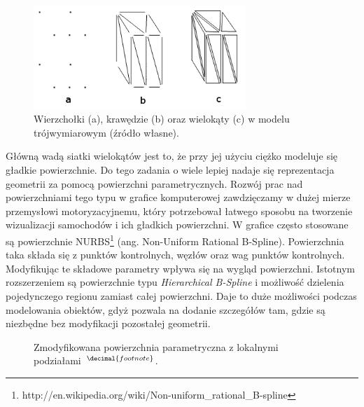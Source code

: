 \begin{figure}
\centering
\includegraphics[width=8cm]{images/v_e_f.png}
\caption{Wierzchołki (a), krawędzie (b) oraz wielokąty (c) w modelu
trójwymiarowym (źródło własne).}
\label{vef_image}
\end{figure}

Główną wadą siatki wielokątów jest to, że przy jej użyciu ciężko modeluje się
gładkie powierzchnie. Do tego zadania o wiele lepiej nadaje się reprezentacja
geometrii za pomocą powierzchni parametrycznych. Rozwój prac nad powierzchniami
tego typu w grafice komputerowej zawdzięczamy w dużej mierze przemysłowi
motoryzacyjnemu, który potrzebował łatwego sposobu na tworzenie wizualizacji
samochodów i ich gładkich powierzchni.
W grafice często stosowane są powierzchnie
NURBS\footnote{http://en.wikipedia.org/wiki/Non-uniform\_rational\_B-spline}
(ang. Non-Uniform Rational B-Spline). Powierzchnia taka składa się z punktów kontrolnych, węzłów oraz wag punktów kontrolnych. Modyfikując te składowe parametry wpływa
się na wygląd powierzchni. Istotnym rozszerzeniem są powierzchnie typu
\emph{Hierarchical B-Spline} i możliwość dzielenia pojedynczego regionu zamiast
całej powierzchni. Daje to duże możliwości podczas modelowania obiektów, gdyż
pozwala na dodanie szczegółów tam, gdzie są niezbędne bez modyfikacji pozostałej
geometrii.
{
\begin{figure}[h]
  \centering
  \quad
  \quad
  \label{fig:hbspline}
  \caption{Zmodyfikowana powierzchnia parametryczna z
  lokalnymi podziałami~$^{\decimal{footnote}}$.}
\end{figure}
}

